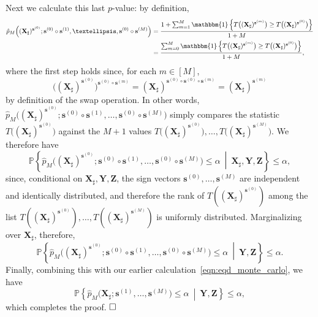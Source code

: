 \documentclass[12pt]{article}
\newcommand{\PPst}[2]{\mathbb{P}\left\{{#1}\  \middle| \ {#2}\right\}}
\newcommand{\One}[1]{{\mathbbm{1}}\left\{{#1}\right\}}
\newcommand{\bs}{\mathbf{s}}
\newcommand{\bX}{\mathbf{X}}
\newcommand{\bY}{\mathbf{Y}}
\newcommand{\bZ}{\mathbf{Z}}
\begin{document}
Next we calculate this last $p$-value: by definition,
\begin{align*}
    \hat{p}_M\Big((\bX_\sharp)^{\bs^{(0)}}; \bs^{(0)}\circ \bs^{(1)},\dots,\bs^{(0)}\circ \bs^{(M)}\Big)
    &=\frac{1 + \sum_{m=1}^M \One{T\bigl((\bX_\sharp)^{\bs^{(m)}}\bigr) \geq T\bigl((\bX_\sharp)^{\bs^{(0)}}\bigr)}}{1+M}\\
    &=\frac{\sum_{m=0}^M \One{T\bigl((\bX_\sharp)^{\bs^{(m)}}\bigr) \geq T\bigl((\bX_\sharp)^{\bs^{(0)}}\bigr)}}{1+M},
\end{align*}
where the first step holds since, for each $m \in [M]$, 
\[
\bigl((\bX_\sharp)^{\bs^{(0)}}\bigr)^{\bs^{(0)}\circ\bs^{(m)}} = (\bX_\sharp)^{\bs^{(0)}\circ \bs^{(0)}\circ \bs^{(m)}} = (\bX_\sharp)^{\bs^{(m)}}
\]
by definition of the swap operation. In other words, $\hat{p}_M\Big((\bX_\sharp)^{\bs^{(0)}}; \bs^{(0)}\circ \bs^{(1)},\dots,\bs^{(0)}\circ \bs^{(M)}\Big)$ simply compares the statistic $T\bigl((\bX_\sharp)^{\bs^{(0)}}\bigr)$ against the $M+1$ values $ T\bigl((\bX_\sharp)^{\bs^{(0)}}\bigr),\dots,T\bigl((\bX_\sharp)^{\bs^{(M)}}\bigr)$.
We therefore have
\[
\PPst{\hat{p}_M\Big((\bX_\sharp)^{\bs^{(0)}}; \bs^{(0)}\circ \bs^{(1)},\dots,\bs^{(0)}\circ \bs^{(M)}\Big) \leq \alpha}{\bX_\sharp,\bY,\bZ}
\leq \alpha,
\]
since, conditional on $\bX_\sharp,\bY,\bZ$, the sign vectors $\bs^{(0)},\dots,\bs^{(M)}$ are independent and identically distributed, and therefore the rank of $T((\bX_\sharp)^{\bs^{(0)}})$ among the list $ T((\bX_\sharp)^{\bs^{(0)}}),\dots,T((\bX_\sharp)^{\bs^{(M)}})$ is uniformly distributed.
Marginalizing over $\bX_\sharp$, therefore,
\[\PPst{\hat{p}_M\Big((\bX_\sharp)^{\bs^{(0)}}; \bs^{(0)}\circ \bs^{(1)},\dots,\bs^{(0)}\circ \bs^{(M)}\Big) \leq \alpha}{\bY,\bZ}
\leq \alpha.\]
Finally, combining this with our earlier calculation~\eqref{eqn:eqd_monte_carlo}, we have
\[\PPst{\hat{p}_M\big(\bX_\sharp; \bs^{(1)},\dots,\bs^{(M)}\big) \leq \alpha}{\bY,\bZ}
\leq \alpha,\]
which completes the proof. $\hfill{\square}$

\end{document}
